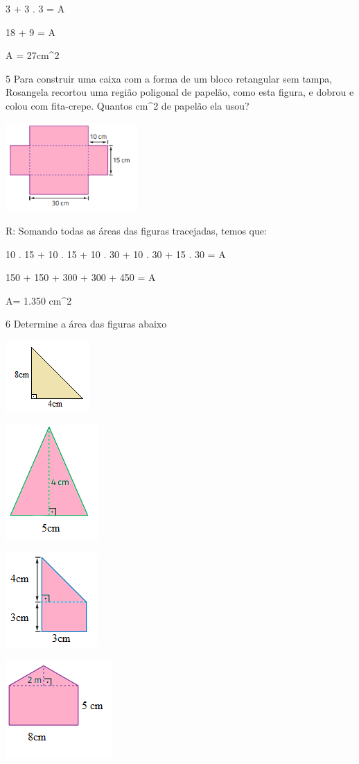 {3 + 3 . 3 = A

18 + 9 = A

A = 27cm^2

\num{5} Para construir uma caixa com a forma de um bloco retangular sem
tampa, Rosangela recortou uma região poligonal de papelão, como esta
figura, e dobrou e colou com fita-crepe. Quantos cm^2 de papelão ela
usou?

\includegraphics[width=1.98333in,height=1.33255in]{./imgSAEB_8_MAT/media/image45.png}

R: Somando todas as áreas das figuras tracejadas, temos que:

10 . 15 + 10 . 15 + 10 . 30 + 10 . 30 + 15 . 30 = A

150 + 150 + 300 + 300 + 450 = A

A= 1.350 cm^2

\num{6} Determine a área das figuras abaixo
\item
\includegraphics[width=1.26042in,height=1.0625in]{./imgSAEB_8_MAT/media/image46.png}
\item
\includegraphics[width=1.39583in,height=1.72917in]{./imgSAEB_8_MAT/media/image47.png}
\item
\includegraphics[width=1.375in,height=1.42708in]{./imgSAEB_8_MAT/media/image48.png}
\item
\includegraphics[width=1.59375in,height=1.46875in]{./imgSAEB_8_MAT/media/image49.png}

}
